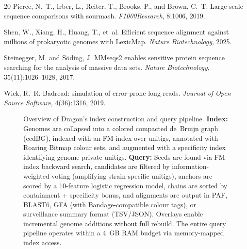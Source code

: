 \documentclass[11pt]{article}
\begin{document}
\begin{thebibliography}{20}
Pierce, N.~T., Irber, L., Reiter, T., Brooks, P., and Brown, C.~T.
\newblock Large-scale sequence comparisons with sourmash.
\newblock \emph{F1000Research}, 8:1006, 2019.

Shen, W., Xiang, H., Huang, T., et~al.
\newblock Efficient sequence alignment against millions of prokaryotic genomes with LexicMap.
\newblock \emph{Nature Biotechnology}, 2025.

Steinegger, M. and S\"oding, J.
\newblock MMseqs2 enables sensitive protein sequence searching for the analysis of massive data sets.
\newblock \emph{Nature Biotechnology}, 35(11):1026--1028, 2017.

Wick, R.~R.
\newblock Badread: simulation of error-prone long reads.
\newblock \emph{Journal of Open Source Software}, 4(36):1316, 2019.

\end{thebibliography}


\clearpage

\begin{figure}[h]
\centering
{}
\caption{Overview of Dragon's index construction and query pipeline. \textbf{Index:} Genomes are collapsed into a colored compacted de~Bruijn graph (ccdBG), indexed with an FM-index over unitigs, annotated with Roaring Bitmap colour sets, and augmented with a specificity index identifying genome-private unitigs. \textbf{Query:} Seeds are found via FM-index backward search, candidates are filtered by information-weighted voting (amplifying strain-specific unitigs), anchors are scored by a 10-feature logistic regression model, chains are sorted by containment + specificity bonus, and alignments are output in PAF, BLAST6, GFA (with Bandage-compatible colour tags), or surveillance summary format (TSV/JSON). Overlays enable incremental genome additions without full rebuild. The entire query pipeline operates within a 4~GB RAM budget via memory-mapped index access.}
\label{fig:architecture}
\end{figure}
\end{document}

